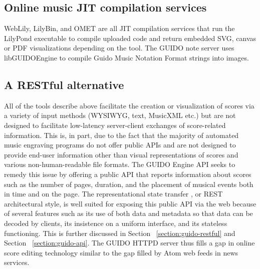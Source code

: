 \documentclass{article}
\begin{document}
\subsection{Online music JIT compilation services}\label{subsection:jit}
WebLily, LilyBin, and OMET are all JIT compilation services that run the LilyPond executable to compile uploaded code and return embedded SVG, canvas or PDF visualizations depending on the tool.  The GUIDO note server \cite{renz98} uses libGUIDOEngine to compile Guido Music Notation Format \cite{hoos98} strings into images.
\subsection{A RESTful alternative}\label{subsection:restful}
All of the tools describe above facilitate the creation or visualization of scores via a variety of input methods (WYSIWYG, text, MusicXML etc.) but are not designed to facilitate low-latency server-client exchanges of score-related information.  This is, in part, due to the fact that the majority of automated music engraving programs do not offer public APIs and are not designed to provide end-user information other than visual representations of scores and various non-human-readable file formats.  The GUIDO Engine API \cite{Dau:09a} seeks to remedy this issue by offering a public API that reports information about scores such as the number of pages, duration, and the placement of musical events both in time and on the page.  The representational state transfer \cite{Fielding00}, or REST architectural style, is well suited for exposing this public API via the web because of several features such as its use of both data and metadata so that data can be decoded by clients, its insistence on a uniform interface, and its stateless functioning.  This is further discussed in Section ~\ref{section:guido-restful} and Section ~\ref{section:guido-api}.  The GUIDO HTTPD server thus fills a gap in online score editing technology similar to the gap filled by Atom web feeds in news services.

\end{document}
